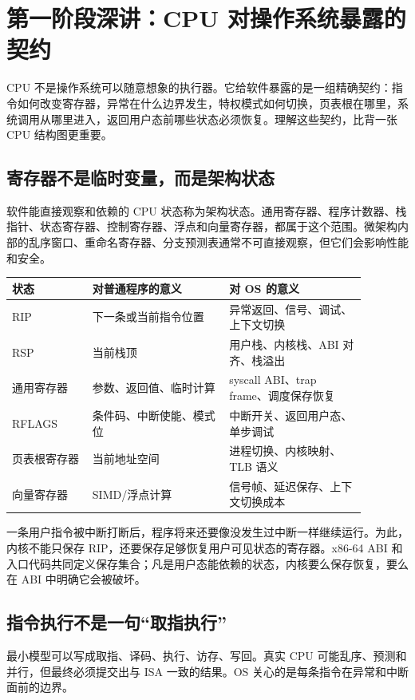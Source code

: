 \section{第一阶段深讲：CPU 对操作系统暴露的契约}

CPU 不是操作系统可以随意想象的执行器。它给软件暴露的是一组精确契约：指令如何改变寄存器，异常在什么边界发生，特权模式如何切换，页表根在哪里，系统调用从哪里进入，返回用户态前哪些状态必须恢复。理解这些契约，比背一张 CPU 结构图更重要。

\subsection{寄存器不是临时变量，而是架构状态}

软件能直接观察和依赖的 CPU 状态称为架构状态。通用寄存器、程序计数器、栈指针、状态寄存器、控制寄存器、浮点和向量寄存器，都属于这个范围。微架构内部的乱序窗口、重命名寄存器、分支预测表通常不可直接观察，但它们会影响性能和安全。

\begin{longtable}{p{0.2\linewidth}p{0.34\linewidth}p{0.34\linewidth}}
\toprule
状态 & 对普通程序的意义 & 对 OS 的意义 \\
\midrule
RIP & 下一条或当前指令位置 & 异常返回、信号、调试、上下文切换 \\
RSP & 当前栈顶 & 用户栈、内核栈、ABI 对齐、栈溢出 \\
通用寄存器 & 参数、返回值、临时计算 & syscall ABI、trap frame、调度保存恢复 \\
RFLAGS & 条件码、中断使能、模式位 & 中断开关、返回用户态、单步调试 \\
页表根寄存器 & 当前地址空间 & 进程切换、内核映射、TLB 语义 \\
向量寄存器 & SIMD/浮点计算 & 信号帧、延迟保存、上下文切换成本 \\
\bottomrule
\end{longtable}

一条用户指令被中断打断后，程序将来还要像没发生过中断一样继续运行。为此，内核不能只保存 RIP，还要保存足够恢复用户可见状态的寄存器。x86-64 ABI 和入口代码共同定义保存集合；凡是用户态能依赖的状态，内核要么保存恢复，要么在 ABI 中明确它会被破坏。

\subsection{指令执行不是一句“取指执行”}

最小模型可以写成取指、译码、执行、访存、写回。真实 CPU 可能乱序、预测和并行，但最终必须提交出与 ISA 一致的结果。OS 关心的是每条指令在异常和中断面前的边界。


